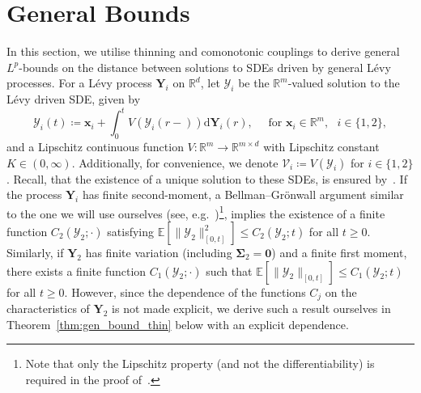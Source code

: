\documentclass[en,oneside,bbfont,article]{amsart}
\theoremstyle{remark}
\newenvironment{remark}
    {\pushQED{\qed}\renewcommand{\qedsymbol}{$\Diamond$}\remarkx}
    {\popQED\endremarkx}
\theoremstyle{definition}
\theoremstyle{definition}
\newcommand\calQ{\mathcal{Q}}
\newcommand\Y{\bm{\mathcal{Y}}}
\newcommand{\V}{\bm{\mathcal{V}}}
\newcommand\Sp{\mathbb{S}}
\newcommand{\mW}{\mathcal{W}}
\newcommand\R{\mathbb{R}}
\newcommand\E{\mathds{E}}
\newcommand\e{\mathord{\mathrm{e}}}
\newcommand\1{\mathds{1}}
\renewcommand\le{\leqslant}
\renewcommand\ge{\geqslant}
\newcommand{\D}{\mathrm{d}}
\begin{document}

\section{General Bounds}
\label{sec:general_bounds}
In this section, we utilise thinning and comonotonic couplings to derive general $ L^p$-bounds on the distance between solutions to SDEs driven by general L\'evy processes. For a L\'evy process $\bm{Y}_i$ on $\R^d$, let $\Y_i$ be the $\R^m$-valued solution to the L\'evy driven SDE, given by
\begin{equation}
\label{eq:SDE_setting}
\Y_i(t)\coloneqq 
    \bm{x}_i+\int_0^t V(\Y_i(r-))\D \bm{Y}_i(r), 
\quad \text{ for }\bm{x}_i \in \R^m ,
    \text{  }i\in\{1,2\},
\end{equation} and a Lipschitz continuous function $V:\R^m \to \R^{m\times d}$ with Lipschitz constant $K \in (0,\infty)$. Additionally, for convenience, we denote $\V_i\coloneqq V(\Y_i)$ for $i\in\{1,2\}$. Recall, that the existence of a unique solution to these SDEs, is ensured by~\cite[Thm~6.2.3]{Applebaum_2009}. If the process $\bm{Y}_i$ has finite second-moment, a Bellman--Gr\"onwall argument similar to the one we will use ourselves (see, e.g.~\cite[Thm~67, p.~342]{MR2273672})\footnote{Note that only the Lipschitz property (and not the differentiability) is required in the proof of~\cite[Thm~67, p.~342]{MR2273672}.}, implies the existence of a finite function $C_2(\Y_2;\cdot)$ satisfying $\E[\|\Y_2\|^2_{[0,t]}]\le C_2(\Y_2;t)$ for all $t\ge 0$. Similarly, if $\bm{Y}_2$ has finite variation (including $\bm{\Sigma}_2=\bm{0}$) and a finite first moment, there exists a finite function $C_1(\Y_2;\cdot)$ such that $\E[\|\Y_2\|_{[0,t]}] \le C_1(\Y_2;t)$ for all $t\ge 0$. However, since the dependence of the functions $C_j$ on the characteristics of $\bm{Y}_2$ is not made explicit, we derive such a result ourselves in Theorem~\ref{thm:gen_bound_thin} below with an explicit dependence.
\end{document}
